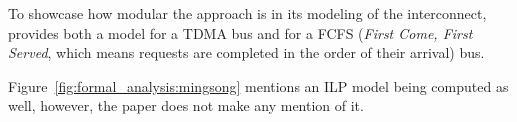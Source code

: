 To showcase how modular the approach is in its modeling of the interconnect,
\cite{5702243} provides both a model for a TDMA bus and for a FCFS
(\textit{First Come, First Served}, which means requests are completed in the
order of their arrival) bus.

Figure~\ref{fig:formal_analysis:mingsong} mentions an ILP model being computed
as well, however, the paper does not make any mention of it.

\stopallthesefloats{}
